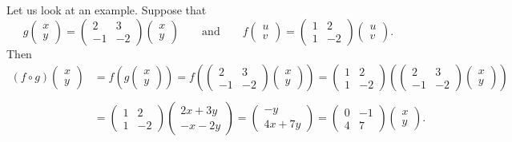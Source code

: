 \documentclass{article}
\begin{document}
Let us look at an example. Suppose that
$$
g\begin{pmatrix} x\\ y \end{pmatrix} =
\begin{pmatrix}
  2 & 3 \\
  -1 & -2
\end{pmatrix}
\begin{pmatrix}
  x \\ y
\end{pmatrix}\qquad
\text{and}
\qquad
f\begin{pmatrix} u\\ v \end{pmatrix} =
\begin{pmatrix}
  1 & 2 \\
  1 & -2
\end{pmatrix}
\begin{pmatrix}
  u \\ v
\end{pmatrix}.
$$
Then
\begin{align*}
(f\circ g)\begin{pmatrix} x\\ y \end{pmatrix} &=
f\left(g\begin{pmatrix} x\\ y \end{pmatrix}\right) =
f\left(\begin{pmatrix}
  2 & 3 \\
  -1 & -2
\end{pmatrix}
\begin{pmatrix}
  x \\ y
\end{pmatrix}\right)
=
\begin{pmatrix}
  1 & 2 \\
  1 & -2
\end{pmatrix}
      \left(
\begin{pmatrix}
  2 & 3 \\
  -1 & -2
\end{pmatrix}
\begin{pmatrix}
  x \\ y
\end{pmatrix}
  \right)\\
  \\
  &= 
\begin{pmatrix}
  1 & 2 \\
  1 & -2
\end{pmatrix}
\begin{pmatrix}
  2 x + 3 y\\
  -x - 2y
\end{pmatrix} =
  \begin{pmatrix}
    - y \\
    4 x + 7 y
  \end{pmatrix}
  =
  \begin{pmatrix}
    0 & -1\\
    4 & 7
  \end{pmatrix}
  \begin{pmatrix}
    x \\ y
  \end{pmatrix}.
\end{align*}
\end{document}
